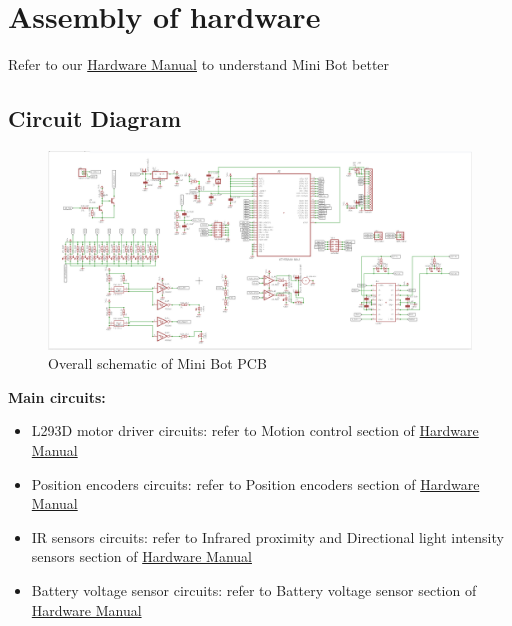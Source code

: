 \documentclass[a4paper,12pt,oneside]{book}
\begin{document}
\newpage

\chapter{Assembly of hardware}
Refer to our \href{https://github.com/eYSIP-2017/eYSIP-2017_DistributedRobotics/blob/master/Documents/Manuals/Hardware%20Manual/document.pdf}{Hardware Manual} to understand Mini Bot better
\section{Circuit Diagram}
\begin{figure}[h!]
	\includegraphics[width=\textwidth]{./PCB_schematic.png}		
	\caption{Overall schematic of Mini Bot PCB}
\end{figure}
\textbf{Main circuits:}	
\begin{itemize}
	\item L293D motor driver circuits: refer to Motion control section of \href{https://github.com/eYSIP-2017/eYSIP-2017_DistributedRobotics/blob/master/Documents/Manuals/Hardware%20Manual/document.pdf}{Hardware Manual}
	\item Position encoders circuits: refer to Position encoders section of \href{https://github.com/eYSIP-2017/eYSIP-2017_DistributedRobotics/blob/master/Documents/Manuals/Hardware%20Manual/document.pdf}{Hardware Manual}
	\item IR sensors circuits: refer to Infrared proximity and Directional
	light intensity sensors section of \href{https://github.com/eYSIP-2017/eYSIP-2017_DistributedRobotics/blob/master/Documents/Manuals/Hardware%20Manual/document.pdf}{Hardware Manual}
	\item Battery voltage sensor circuits: refer to Battery voltage sensor section of \href{https://github.com/eYSIP-2017/eYSIP-2017_DistributedRobotics/blob/master/Documents/Manuals/Hardware%20Manual/document.pdf}{Hardware Manual}
\end{itemize}
\end{document}
